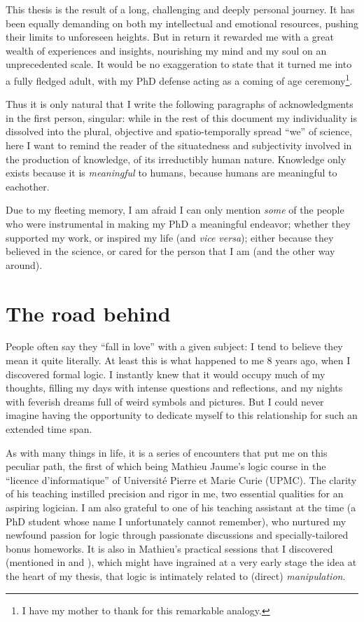 
This thesis is the result of a long, challenging and deeply personal journey. It has been equally demanding on both my intellectual and emotional resources, pushing their limits to unforeseen heights. But in return it rewarded me with a great wealth of experiences and insights, nourishing my mind and my soul on an unprecedented scale. It would be no exaggeration to state that it turned me into a fully fledged adult, with my PhD defense acting as a coming of age ceremony\footnote{I have my mother to thank for this remarkable analogy.}.

Thus it is only natural that I write the following paragraphs of acknowledgments in the first person, singular: while in the rest of this document my individuality is dissolved into the plural, objective and spatio-temporally spread ``we'' of science, here I want to remind the reader of the situatedness and subjectivity involved in the production of knowledge, of its irreductibly human nature. Knowledge only exists because it is \emph{meaningful} to humans, because humans are meaningful to eachother.

Due to my fleeting memory, I am afraid I can only mention \emph{some} of the people who were instrumental in making my PhD a meaningful endeavor; whether they supported my work, or inspired my life (and \textit{vice versa}); either because they believed in the science, or cared for the person that I am (and the other way around).

\section*{The road behind}

People often say they ``fall in love'' with a given subject: I tend to believe they mean it quite literally. At least this is what happened to me 8 years ago, when I discovered formal logic. I instantly knew that it would occupy much of my thoughts, filling my days with intense questions and reflections, and my nights with feverish dreams full of weird symbols and pictures. But I could never imagine having the opportunity to dedicate myself to this relationship for such an extended time span.

As with many things in life, it is a series of encounters that put me on this peculiar path, the first of which being Mathieu Jaume's logic course in the ``licence d'informatique'' of Université Pierre et Marie Curie (UPMC). The clarity of his teaching instilled precision and rigor in me, two essential qualities for an aspiring logician. I am also grateful to one of his teaching assistant at the time (a PhD student whose name I unfortunately cannot remember), who nurtured my newfound passion for logic through passionate discussions and specially-tailored bonus homeworks. It is also in Mathieu's practical sessions that I discovered  (mentioned in  and ), which might have ingrained at a very early stage the idea at the heart of my thesis, that logic is intimately related to (direct) \emph{manipulation}.

